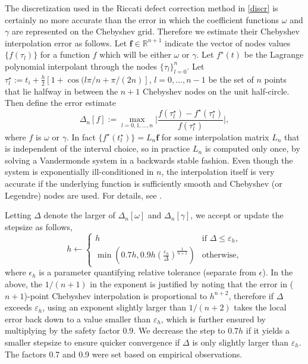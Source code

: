 \documentclass[10pt]{article}
\newcommand{\be}{\begin{equation}}
\newcommand{\ee}{\end{equation}}
\newcommand{\mbf}[1]{{\mathbf #1}}
\newcommand{\R}{\mathbb{R}}
\newcommand{\eps}{\epsilon}
\newcommand{\om}{\omega}
\newcommand{\g}{\gamma}
\begin{document}
The discretization used in the Riccati defect correction method in \cref{discr} is certainly no more accurate than
the error in which the coefficient functions $\om$ and $\g$ are represented
on the Chebyshev grid.
Therefore we estimate their Chebyshev interpolation error as follows.
Let $\mbf{f}\in\R^{n+1}$ indicate the vector of nodes values
$\{f(\tau_l)\}$ for a function $f$ which will be either $\om$ or $\g$.
Let $f^\star(t)$ be the Lagrange polynomial interpolant through the
nodes $\{\tau_l\}_{l=0}^n$.
Let $\tau^\star_l := t_i + \tfrac{h}{2}[1 + \cos(l\pi/n + \pi/(2n)]$, $l=0,\dots,n-1$ be the set of $n$ points that lie halfway in between the $n+1$ Chebyshev nodes on the unit half-circle.
Then define the error estimate
\be
    \Delta_n[f] := \max_{l = 0, 1, \ldots, n} \biggl| \frac{f(\tau^{\star}_l) -
    f^{\star}(\tau^{\star}_l)}{f(\tau^{\star}_l)} \biggr|,
\ee
where $f$ is $\om$ or $\g$.
In fact $\{f^{\star}(t^{\star}_l)\} = L_n \mbf{f}$ for some interpolation matrix
$L_n$ that is independent of the interval choice, so in practice
$L_n$ is computed only once, by solving a Vandermonde system in a backwards
stable fashion. Even though the system is exponentially ill-conditioned in $n$,
the interpolation itself is very accurate if the underlying function is
sufficiently smooth and Chebyshev (or Legendre) nodes are used. For details,
see \cite[Appendix A]{helsing_close}.

Letting $\Delta$ denote the larger of $\Delta_n[\om]$ and $\Delta_n[\g]$, we accept or update the stepsize as follows,
\be
    h \leftarrow \begin{cases}
        h &\text{if } \Delta \leq \varepsilon_h, \\
        \min \left( 0.7h, 0.9 h \left( \frac{\varepsilon_h}{\Delta} \right)^{\frac{1}{n+1}} \right) &\text{otherwise},
    \end{cases}
    \ee
where $\eps_h$ is a parameter quantifying relative tolerance (separate from $\eps$). In the above, the $1/(n+1)$ in the exponent is justified by noting that the
error in ($n+1$)-point Chebyshev interpolation is proportional to $h^{n+2}$, therefore if
$\Delta$ exceeds $\varepsilon_h$, using an exponent slightly larger than $1/(n+2)$ takes
the local error back down to a value smaller than $\varepsilon_h$, which is further
ensured by multiplying by the safety factor 0.9. We decrease the step to $0.7h$
if it yields a smaller stepsize to ensure quicker convergence if $\Delta$ is
only slightly larger than $\varepsilon_h$. The factors 0.7 and 0.9 were set based on
empirical observations. 
\end{document}
